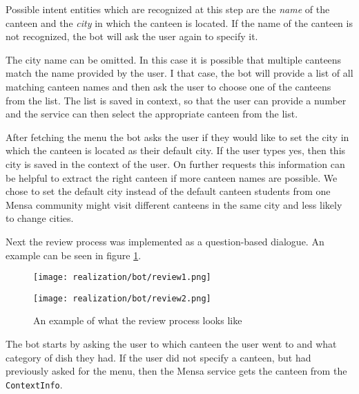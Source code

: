 Possible intent entities which are recognized at this step are the \emph{name} of the canteen and the \emph{city} in which the canteen is located.
If the name of the canteen is not recognized, the bot will ask  the user again to specify it. 

The city name can be omitted. In this case it is possible that multiple canteens match the name provided by the user. I that case, the bot will provide a list of all matching canteen names and then ask the user to choose one of the canteens from the list. The list is saved in context, so that the user can provide a number and the service can then select the appropriate canteen from the list.

After fetching the menu the bot asks the user if they would like to set the city in which the canteen is located as their default city. If the user types yes, then this city is saved in the context of the user. On further requests this information can be helpful to extract the right canteen if more canteen names are possible. 
We chose to set the default city instead of the default canteen students from one Mensa community might visit different canteens in the same city and less likely to change cities. 

Next the review process was implemented as a question-based dialogue. An example can be seen in figure \ref{fig:addReview}.


\begin{figure}[h]
    \begin{minipage}{0.5\textwidth}
        \texttt{[image: realization/bot/review1.png]} 
    \end{minipage}
    \begin{minipage}{0.5\textwidth}
        \texttt{[image: realization/bot/review2.png]}
        
    \end{minipage}
    \caption{An example of what the review process looks like}
    \label{fig:addReview}
\end{figure}

The bot starts by asking the user to which canteen the user went to and what category of dish they had. If the user did not specify a canteen, but had previously asked for the menu, then the Mensa service gets the canteen from the \texttt{ContextInfo}. 

